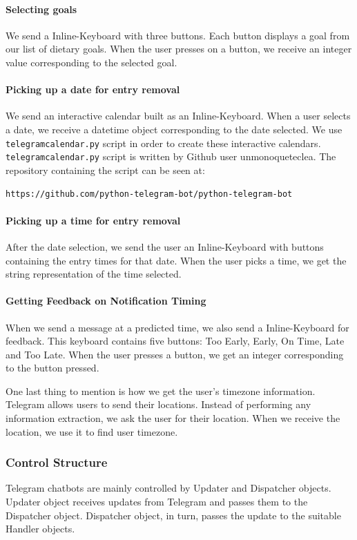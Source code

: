 \paragraph{Selecting goals} 
We send a Inline-Keyboard with three buttons. 
Each button displays a goal from our list of dietary goals. 
When the user presses on a button, we receive an integer value corresponding to the selected goal.

\paragraph{Picking up a date for entry removal} 
We send an interactive calendar built as an Inline-Keyboard.
When a user selects a date, we receive a datetime object corresponding to the date selected.
We use \texttt{telegramcalendar.py} script in order to create these interactive calendars.
\texttt{telegramcalendar.py} script is written by Github user unmonoqueteclea.
The repository containing the script can be seen at:

\texttt{https://github.com/python-telegram-bot/python-telegram-bot}

\paragraph{Picking up a time for entry removal} 
After the date selection, we send the user an Inline-Keyboard with buttons containing the entry times for that date.
When the user picks a time, we get the string representation of the time selected.

\paragraph{Getting Feedback on Notification Timing} 
When we send a message at a predicted time, we also send a Inline-Keyboard for feedback.
This keyboard contains five buttons: Too Early, Early, On Time, Late and Too Late.
When the user presses a button, we get an integer corresponding to the button pressed.

One last thing to mention is how we get the user's timezone information.
Telegram allows users to send their locations.
Instead of performing any information extraction, we ask the user for their location.
When we receive the location, we use it to find user timezone.

\subsubsection{Control Structure}
Telegram chatbots are mainly controlled by Updater and Dispatcher objects.
Updater object receives updates from Telegram and passes them to the Dispatcher object.
Dispatcher object, in turn, passes the update to the suitable Handler objects.

